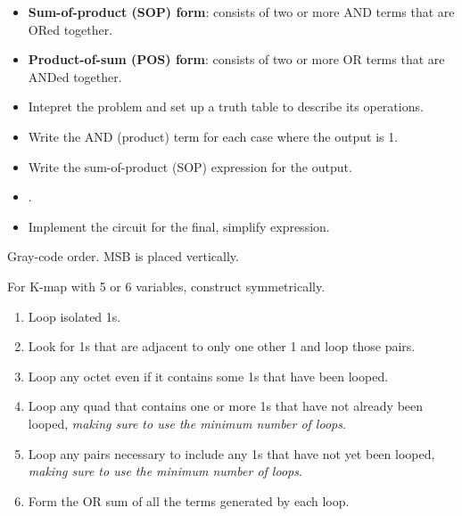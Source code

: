 \begin{multicols}{2}

    \begin{itemize}
      \item \textbf{Sum-of-product (SOP) form}: consists of two or more AND terms
        that are ORed together.
      \item \textbf{Product-of-sum (POS) form}: consists of two or more OR terms
        that are ANDed together.
    \end{itemize}

    \begin{itemize}
      \item Intepret the problem and set up a truth table to describe its
        operations.
      \item Write the AND (product) term for each case where the output is 1.
      \item Write the sum-of-product (SOP) expression for the output.
      \item {}.
      \item Implement the circuit for the final, simplify expression.
    \end{itemize}

      \par Gray-code order. MSB is placed vertically.
      \par For K-map with 5 or 6 variables, construct symmetrically.
      \begin{enumerate}
        \item Loop isolated 1s.
        \item Look for 1s that are adjacent to only one other 1 and loop
        those pairs.
        \item Loop any octet even if it contains some 1s that have been looped.
        \item Loop any quad that contains one or more 1s that have not already been looped,
          \textit{making sure to use the minimum number of loops}.
        \item Loop any pairs necessary to include any 1s that have not yet been looped,
          \textit{making sure to use the minimum number of loops}.
        \item Form the OR sum of all the terms generated by each loop.
      \end{enumerate}

\end{multicols}